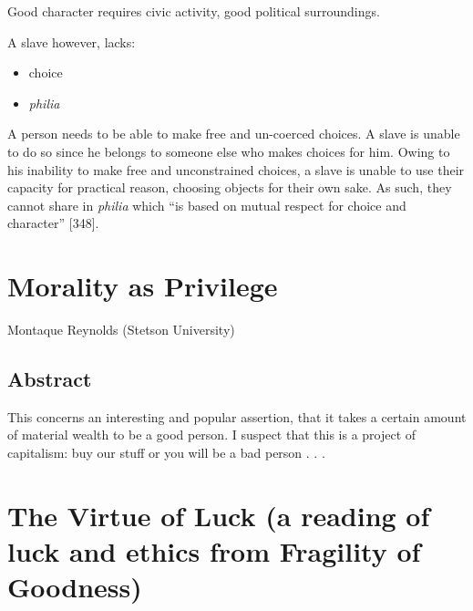 \documentclass[
  letterpaper,
  DIV=11,
  numbers=noendperiod]{scrreprt}
\providecommand{\tightlist}{%
  \setlength{\itemsep}{0pt}\setlength{\parskip}{0pt}}\usepackage{longtable,booktabs,array}
\begin{document}
\begin{tcolorbox}[enhanced jigsaw, arc=.35mm, breakable, rightrule=.15mm, colback=white, colframe=quarto-callout-important-color-frame, bottomrule=.15mm, leftrule=.75mm, opacityback=0, toprule=.15mm, left=2mm]
\begin{tcolorbox}[enhanced jigsaw, arc=.35mm, breakable, rightrule=.15mm, colback=white, colframe=quarto-callout-tip-color-frame, bottomrule=.15mm, leftrule=.75mm, opacityback=0, toprule=.15mm, left=2mm]
Good character requires civic activity, good political surroundings.

A slave however, lacks:

\begin{itemize}
\tightlist
\item
  choice
\item
  \emph{philia}
\end{itemize}

A person needs to be able to make free and un-coerced choices. A slave
is unable to do so since he belongs to someone else who makes choices
for him. Owing to his inability to make free and unconstrained choices,
a slave is unable to use their capacity for practical reason, choosing
objects for their own sake. As such, they cannot share in \emph{philia}
which ``is based on mutual respect for choice and character'' {[}348{]}.

\chapter{Morality as Privilege}\label{morality-as-privilege-1}

Montaque Reynolds (Stetson University)

\hfill\break

\section{Abstract}\label{abstract-1}

This concerns an interesting and popular assertion, that it takes a
certain amount of material wealth to be a good person. I suspect that
this is a project of capitalism: buy our stuff or you will be a bad
person . . .

\chapter{The Virtue of Luck (a reading of luck and ethics from Fragility
of
Goodness)}\label{the-virtue-of-luck-a-reading-of-luck-and-ethics-from-fragility-of-goodness-1}


\end{tcolorbox}
\end{tcolorbox}
\end{document}
